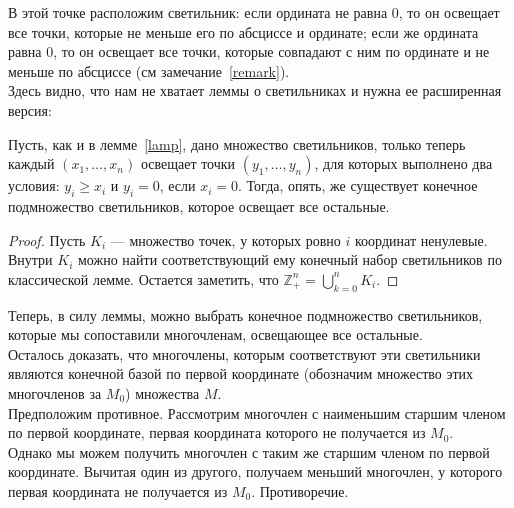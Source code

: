 В этой точке расположим светильник: если ордината не равна 0, то он освещает все точки, которые не меньше его по абсциссе и ординате; если же ордината равна 0, то он освещает все точки, которые совпадают с ним по ординате и не меньше по абсциссе (см замечание~\ref{remark}).\\
Здесь видно, что нам не хватает леммы о светильниках и нужна ее расширенная версия:\vskip 0.1in\noindent
\begin{lemma}
    Пусть, как и в лемме~\ref{lamp}, дано множество светильников, только теперь каждый $(x_1,\ldots,x_n)$ освещает точки $(y_1,\ldots,y_n)$, для которых выполнено два условия: $y_i\geq x_i$ и $y_i=0$, если $x_i=0$.
    Тогда, опять, же существует конечное подмножество светильников, которое освещает все остальные.
\end{lemma}
\begin{proof}
    Пусть $K_i$ --- множество точек, у которых ровно $i$ координат ненулевые.
    Внутри $K_i$ можно найти соответствующий ему конечный набор светильников по классической лемме.
    Остается заметить, что $\mathbb{Z}_+^n=\bigcup_{k=0}^n K_i$.
\end{proof}
Теперь, в силу леммы, можно выбрать конечное подмножество светильников, которые мы сопоставили многочленам, освещающее все остальные.\\
Осталось доказать, что многочлены, которым соответствуют эти светильники являются конечной базой по первой координате (обозначим множество этих многочленов за $M_0$) множества $M$. \\
Предположим противное.
Рассмотрим многочлен с наименьшим старшим членом по первой координате, первая координата которого не получается из $M_0$.\\
Однако мы можем получить многочлен с таким же старшим членом по первой координате.
Вычитая один из другого, получаем меньший многочлен, у которого первая координата не получается из $M_0$.
Противоречие.

